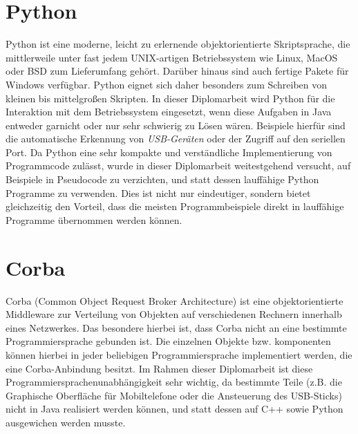 \section{Python}
    Python ist eine moderne, leicht zu erlernende objektorientierte Skriptsprache, die mittlerweile unter fast
    jedem UNIX-artigen Betriebssystem wie Linux, MacOS oder BSD zum Lieferumfang gehört. Darüber hinaus sind
    auch fertige Pakete für Windows verfügbar. Python eignet sich daher besonders zum Schreiben von kleinen
    bis mittelgroßen Skripten. In dieser Diplomarbeit wird Python für die Interaktion mit dem Betriebssystem
    eingesetzt, wenn diese Aufgaben in Java entweder garnicht oder nur sehr schwierig zu Lösen wären. Beispiele
    hierfür sind die automatische Erkennung von \emph{USB-Geräten} oder der Zugriff auf den seriellen Port.
    Da Python eine sehr kompakte und verständliche Implementierung von Programmcode zulässt, wurde in dieser
    Diplomarbeit weitestgehend versucht, auf Beispiele in Pseudocode zu verzichten, und statt dessen lauffähige
    Python Programme zu verwenden. Dies ist nicht nur eindeutiger, sondern bietet gleichzeitig den Vorteil,
    dass die meisten Programmbeispiele direkt in lauffähige Programme übernommen werden können.

\section{Corba}
    Corba (Common Object Request Broker Architecture) ist eine objektorientierte Middleware zur Verteilung von 
    Objekten auf verschiedenen Rechnern innerhalb eines Netzwerkes. Das besondere hierbei ist, dass Corba
    nicht an eine bestimmte Programmiersprache gebunden ist. Die einzelnen Objekte bzw. komponenten können
    hierbei in jeder beliebigen Programmiersprache implementiert werden, die eine Corba-Anbindung besitzt.
    Im Rahmen dieser Diplomarbeit ist diese Programmiersprachenunabhängigkeit sehr wichtig, da bestimmte
    Teile (z.B. die Graphische Oberfläche für Mobiltelefone oder die Ansteuerung des USB-Sticks) nicht in 
    Java realisiert werden können, und statt dessen auf C++ sowie Python ausgewichen werden musste.
